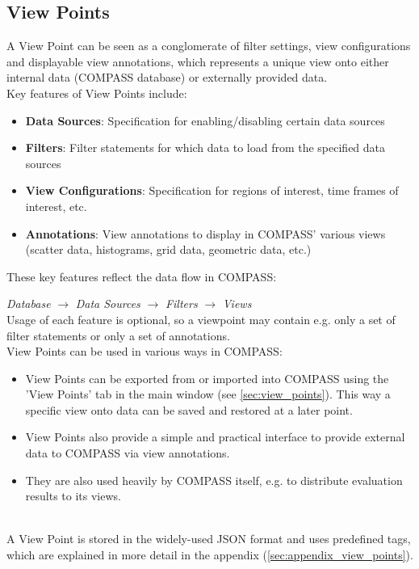 \subsection*{View Points}
\label{sec:key_concepts_viewpoints}

A View Point can be seen as a conglomerate of filter settings, view configurations and displayable view annotations, 
which represents a unique view onto either internal data (COMPASS database) or externally provided data. \\

Key features of View Points include: \\

\begin{itemize}
    \item \textbf{Data Sources}: Specification for enabling/disabling certain data sources
    \item \textbf{Filters}: Filter statements for which data to load from the specified data sources
    \item \textbf{View Configurations}: Specification for regions of interest, time frames of interest, etc.
    \item \textbf{Annotations}: View annotations to display in COMPASS' various views (scatter data, histograms, grid data, geometric data, etc.) 
\end{itemize}

These key features reflect the data flow in COMPASS:  

\textit{Database} $\rightarrow$ \textit{Data Sources} $\rightarrow$ \textit{Filters} $\rightarrow$ \textit{Views} \\

Usage of each feature is optional, so a viewpoint may contain e.g. only a set of filter statements or only a set of annotations. \\

View Points can be used in various ways in COMPASS: \\

\begin{itemize}
    \item View Points can be exported from or imported into COMPASS using the 'View Points' tab in the main window (see \ref{sec:view_points}).
    This way a specific view onto data can be saved and restored at a later point.
    \item View Points also provide a simple and practical interface to provide external data to COMPASS via view annotations.
    \item They are also used heavily by COMPASS itself, e.g. to distribute evaluation results to its views.
\end{itemize}
\ \\

A View Point is stored in the widely-used JSON format and uses predefined tags, which are explained in more detail in 
the appendix (\ref{sec:appendix_view_points}).
